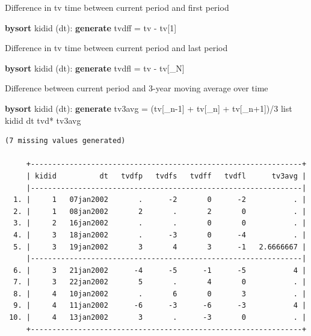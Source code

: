 \documentclass[
]{book}
\newenvironment{Shaded}{\begin{snugshade}}{\end{snugshade}}
\newcommand{\DataTypeTok}[1]{\textcolor[rgb]{0.13,0.29,0.53}{#1}}
\newcommand{\KeywordTok}[1]{\textcolor[rgb]{0.13,0.29,0.53}{\textbf{#1}}}
\newcommand{\NormalTok}[1]{#1}
\newcommand{\OtherTok}[1]{\textcolor[rgb]{0.56,0.35,0.01}{#1}}
\begin{document}
Difference in tv time between current period and first period

\begin{Shaded}
\begin{Highlighting}[]
\KeywordTok{bysort}\NormalTok{ kidid (dt): }\KeywordTok{generate}\NormalTok{ tvdff = tv {-} tv[1]}
\end{Highlighting}
\end{Shaded}

Difference in tv time between current period and last period

\begin{Shaded}
\begin{Highlighting}[]
\KeywordTok{bysort}\NormalTok{ kidid (dt): }\KeywordTok{generate}\NormalTok{ tvdfl = tv {-} tv[\_N]}
\end{Highlighting}
\end{Shaded}

Difference between current period and 3-year moving average over time

\begin{Shaded}
\begin{Highlighting}[]
\KeywordTok{bysort}\NormalTok{ kidid (dt): }\KeywordTok{generate}\NormalTok{ tv3avg = (tv[}\DataTypeTok{\_n}\NormalTok{{-}1] + tv[}\DataTypeTok{\_n}\NormalTok{] + tv[}\DataTypeTok{\_n}\NormalTok{+1])/3}
\OtherTok{list}\NormalTok{ kidid dt tvd* tv3avg}
\end{Highlighting}
\end{Shaded}

\begin{verbatim}
(7 missing values generated)

     +---------------------------------------------------------------+
     | kidid          dt   tvdfp   tvdfs   tvdff   tvdfl      tv3avg |
     |---------------------------------------------------------------|
  1. |     1   07jan2002       .      -2       0      -2           . |
  2. |     1   08jan2002       2       .       2       0           . |
  3. |     2   16jan2002       .       .       0       0           . |
  4. |     3   18jan2002       .      -3       0      -4           . |
  5. |     3   19jan2002       3       4       3      -1   2.6666667 |
     |---------------------------------------------------------------|
  6. |     3   21jan2002      -4      -5      -1      -5           4 |
  7. |     3   22jan2002       5       .       4       0           . |
  8. |     4   10jan2002       .       6       0       3           . |
  9. |     4   11jan2002      -6      -3      -6      -3           4 |
 10. |     4   13jan2002       3       .      -3       0           . |
     +---------------------------------------------------------------+
\end{verbatim}
\end{document}
